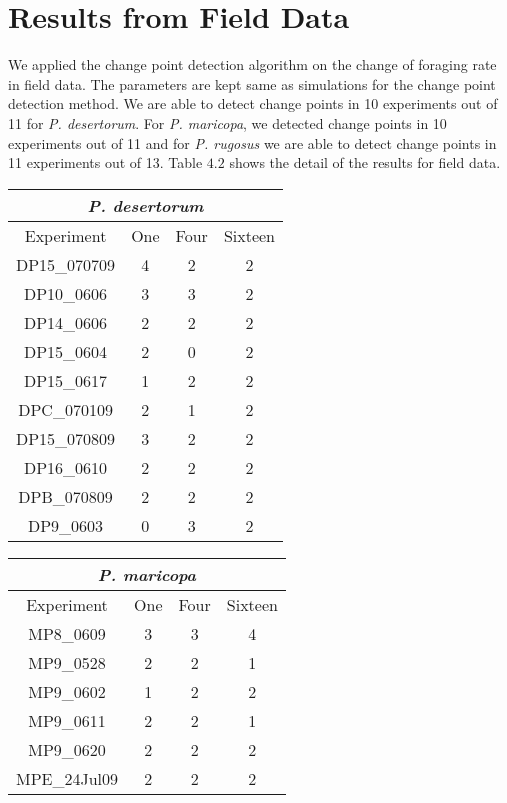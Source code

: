 \section{\label{section:Results from Field Data}Results from Field Data} 
We applied the change point detection algorithm on the change of foraging rate in field data. The parameters are kept same as simulations for the change point detection method. We are able to detect change points in 10 experiments out of 11 for \textit{P. desertorum}. For \textit{P. maricopa}, we detected change points in 10 experiments out of 11 and for \textit{P. rugosus} we are able to detect change points in 11 experiments out of 13. Table $4.2$ shows the detail of the results for field data.\par
\begin{table}[H]
	\footnotesize
	\begin{tabular}{|c|c|c|c|}
		\hline
		\multicolumn{4}{|c|}{\textit{P. desertorum}} \\ \hline
		Experiment & One & Four & Sixteen \\ \hline
		DP15\_070709 & 4 & 2 & 2 \\ \hline
		DP10\_0606 & 3 & 3 & 2 \\ \hline
		DP14\_0606 & 2 & 2 & 2 \\ \hline
		DP15\_0604 & 2 & 0 & 2  \\ \hline   
		DP15\_0617 & 1 & 2 & 2 \\ \hline
		DPC\_070109 & 2 & 1 & 2  \\ \hline
		DP15\_070809 & 3 & 2 & 2  \\ \hline
		DP16\_0610 & 2 & 2 & 2  \\ \hline
		DPB\_070809 & 2 & 2 & 2  \\ \hline
		DP9\_0603 & 0 & 3 & 2  \\ \hline
	\end{tabular}
	\hfill
	\begin{tabular}{|c|c|c|c|}
		\hline
		\multicolumn{4}{|c|}{\textit{P. maricopa}} \\ \hline
		Experiment & One & Four & Sixteen \\ \hline
		MP8\_0609 & 3 & 3 & 4 \\ \hline
		MP9\_0528 & 2 & 2 & 1 \\ \hline
		MP9\_0602 & 1 & 2 & 2 \\ \hline
		MP9\_0611 & 2 & 2 & 1  \\ \hline   
		MP9\_0620 & 2 & 2 & 2 \\ \hline
		MPE\_24Jul09 & 2 & 2 & 2  \\ \hline

\end{tabular}
\end{table}
